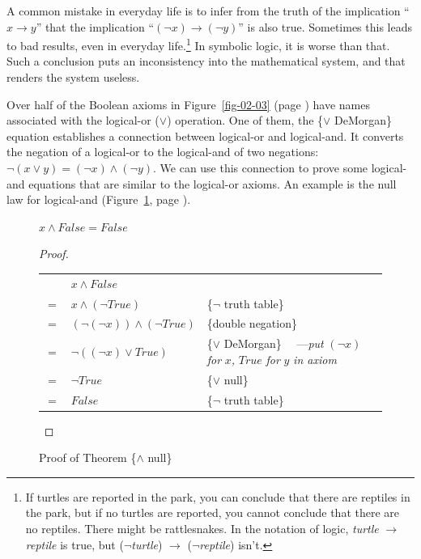 A common mistake in everyday life is to infer from the truth of the
implication ``$x \rightarrow y$'' that the implication
``$(\neg x) \rightarrow (\neg y)$''
is also true. Sometimes this leads to bad
results, even in everyday life.\footnote{If turtles
are reported in the park,
you can conclude that there are reptiles in the park,
but if no turtles are reported, you cannot conclude
that there are no reptiles.
There might be rattlesnakes.
In the notation of logic,
\emph{turtle} $\rightarrow$ \emph{reptile} is true,
but ($\neg$\emph{turtle}) $\rightarrow$ ($\neg$\emph{reptile}) isn't.}
In symbolic logic,
it is worse than that. Such a conclusion puts an
inconsistency into the mathematical system, and that renders the system useless.

Over half of the Boolean axioms in Figure~\ref{fig-02-03} (page \pageref{fig-02-03})
have names associated with the logical-or ($\vee$) operation.
One of them, the
\{$\vee$ DeMorgan\} equation
establishes a connection between logical-or and logical-and.
It converts the negation of a logical-or to the logical-and of two negations:
$\neg(x \vee y) = (\neg x) \wedge (\neg y)$.
We can use this connection to prove some logical-and equations
that are similar to the logical-or axioms.
An example is the null law for logical-and
(Figure~\ref{fig:and-null-thm}, page \pageref{fig:and-null-thm}).

\begin{figure}
\begin{theorem}
$x \wedge False = False$
\end{theorem}

\begin{proof}
\mbox{} \\
\begin{tabular}{llp{3.15in}}
    & $x \wedge False$                       & \\
$=$ & $x \wedge (\neg True)$                 & \{$\neg$ truth table\} \\
$=$ & $(\neg (\neg x)) \wedge (\neg True)$   & \{double negation\} \\
$=$ & $\neg ((\neg x) \vee True)$            & \{$\vee$ DeMorgan\} ~~---\emph{put} $(\neg x)$ \emph{for} $x$\emph{,} $True$ \emph{for} $y$ \emph{in axiom}\\
$=$ & $\neg True$                            & \{$\vee$ null\} \\
$=$ & $False$                                & \{$\neg$ truth table\} \\
\end{tabular}

\end{proof}
\caption{Proof of Theorem \{$\wedge$ null\}}
\label{fig:and-null-thm}
\end{figure}

